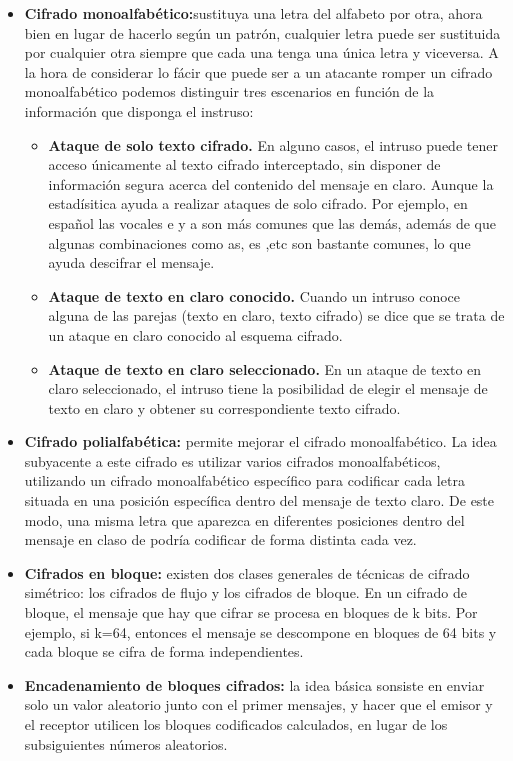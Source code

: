 \documentclass[a4paper,11pt]{article}
\begin{document}
\begin{itemize}
\item \textbf{Cifrado monoalfabético:}sustituya una letra del alfabeto por otra, ahora bien en lugar de hacerlo según un patrón, cualquier letra puede ser sustituida por cualquier otra siempre que cada una tenga una única letra y viceversa. A la hora de considerar lo fácir que puede ser a un atacante romper un cifrado monoalfabético podemos distinguir tres escenarios en función de la información que disponga el instruso:

	\begin{itemize}
	\item \textbf{Ataque de solo texto cifrado.} En alguno casos, el intruso puede tener acceso 		únicamente al texto cifrado interceptado, sin disponer de información segura acerca del 				contenido del mensaje en claro. Aunque la estadísitica ayuda a realizar ataques de solo cifrado. 	Por ejemplo, en español las vocales e y a son más comunes que las demás, además de que algunas 			combinaciones como as, es ,etc son bastante comunes, lo que ayuda descifrar el mensaje.

	\item \textbf{Ataque de texto en claro conocido.} Cuando un intruso conoce alguna de las parejas 	(texto en claro, texto cifrado) se dice que se trata de un ataque en claro conocido al esquema 		cifrado.

\item \textbf{Ataque de texto en claro seleccionado.} En un ataque de texto en claro seleccionado, el intruso tiene la posibilidad de elegir el mensaje de texto en claro y obtener su correspondiente texto cifrado.
	\end{itemize}

\item \textbf{Cifrado polialfabética:} permite mejorar el cifrado monoalfabético. La idea subyacente a este cifrado es utilizar varios cifrados monoalfabéticos, utilizando un cifrado monoalfabético específico para codificar cada letra situada en una posición específica dentro del mensaje de texto claro. De este modo, una misma letra que aparezca en diferentes posiciones dentro del mensaje en claso de podría codificar de forma distinta cada vez.

\item \textbf{Cifrados en bloque:} existen dos clases generales de técnicas de cifrado simétrico: los cifrados de flujo y los cifrados de bloque. En un cifrado de bloque, el mensaje que hay que cifrar se procesa en bloques de k bits. Por ejemplo, si k=64, entonces el mensaje se descompone en bloques de 64 bits y cada bloque se cifra de forma independientes. 

\item \textbf{Encadenamiento de bloques cifrados:} la idea básica sonsiste en enviar solo un valor aleatorio junto con el primer mensajes, y hacer que el emisor y el receptor utilicen los bloques codificados calculados, en lugar de los subsiguientes números aleatorios.
\end{itemize}
\end{document}
